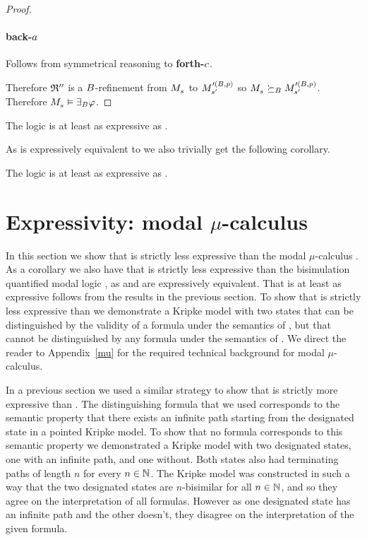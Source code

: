 \begin{proof}
\paragraph{back-$\agentA$}
Follows from symmetrical reasoning to {\bf forth-$\agentC$}.

Therefore $\refinement''$ is a $\agentsB$-refinement from $\kPModel{\kStateS}$ to $\kPModel[\prime(\agentsB, \atomP)]{\kStateSP}$ so $\kPModel{\kStateS} \simulatesBs \kPModel[\prime(\agentsB, \atomP)]{\kStateSP}$.
Therefore $\kPModel{\kStateS} \entails \somerefsBs \phi$.
\end{proof}

\begin{corollary}
The logic \logicBqmlKF{} is at least as expressive as \logicRmlKF{}.
\end{corollary}

As \logicBqmlKF{} is expressively equivalent to \logicMuKF{} we also trivially get the following corollary. 

\begin{corollary}
The logic \logicMuKF{} is at least as expressive as \logicRmlKF{}.
\end{corollary}

\section{Expressivity: modal $\mu$-calculus}\label{rml-k4-mu}

In this section we show that \logicRmlKF{} is strictly less expressive than the modal $\mu$-calculus \logicMuKF{}.
As a corollary we also have that \logicRmlKF{} is strictly less expressive than the bisimulation quantified modal logic \logicBqmlKF{}, as \logicMuKF{} and \logicBqmlKF{} are expressively equivalent.
That \logicMuKF{} is at least as expressive follows from the results in the previous section.
To show that \logicRmlKF{} is strictly less expressive than \logicMuKF{} we demonstrate a \classKF{} Kripke model with two states that can be distinguished by the validity of a \langMu{} formula under the semantics of \logicMuKF{}, but that cannot be distinguished by any \langRml{} formula under the semantics of \logicRmlKF{}. 
We direct the reader to Appendix~\ref{mu} for the required technical background for modal $\mu$-calculus.

In a previous section we used a similar strategy to show that \logicRmlKF{} is strictly more expressive than \logicKF{}.
The distinguishing \langRml{} formula that we used corresponds to the semantic property that there exists an infinite path starting from the designated state in a pointed Kripke model.
To show that no \langMl{} formula corresponds to this semantic property we demonstrated a \classKF{} Kripke model with two designated states, one with an infinite path, and one without.
Both states also had terminating paths of length $n$ for every $n \in \naturals$.
The Kripke model was constructed in such a way that the two designated states are $n$-bisimilar for all $n \in \naturals$, and so they agree on the interpretation of all \langMl{} formulas.
However as one designated state has an infinite path and the other doesn't, they disagree on the interpretation of the given \langRml{} formula.

